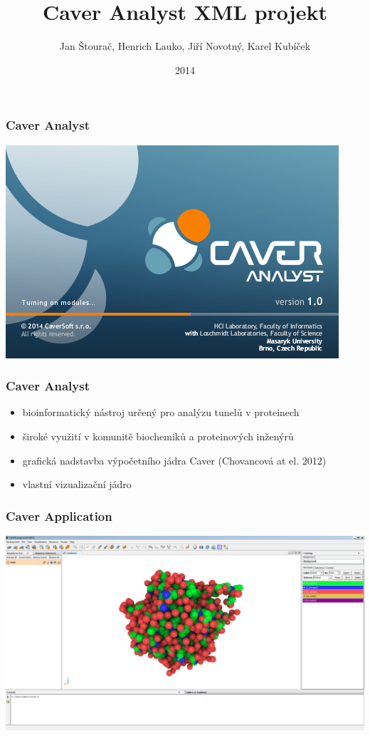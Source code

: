 \documentclass[slovak]{beamer}
\title{Caver Analyst XML projekt}
\date{2014}
\author{
	Jan Štourač, Henrich Lauko, Jiří Novotný, Karel Kubíček
}
\begin{document}
\begin{frame}
	\titlepage
\end{frame}

\begin{frame}
\frametitle{Caver Analyst}
	\includegraphics[width=\linewidth]{caver_start.jpg}
\end{frame}

\begin{frame}
\frametitle{Caver Analyst}
	\begin{itemize}
		\item bioinformatický nástroj určený pro analýzu tunelů v proteinech
		\item široké využití v komunitě biochemiků a proteinových inženýrů 
		\item grafická nadstavba výpočetního jádra Caver (Chovancová at el. 2012)
		\item vlastní vizualizační jádro
	\end{itemize}
\end{frame}

\begin{frame}
\frametitle{Caver Application}
	\begin{center}
		\includegraphics[width=\linewidth]{caver.png}
	\end{center}
\end{frame}
\end{document}
